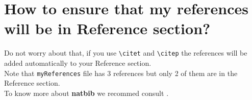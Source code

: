 \documentclass[10pt]{article}
\begin{document}
\section{How to ensure that my references will be in Reference section?}
Do not worry about that, if you use \verb|\citet| and \verb|\citep| the references will be added automatically to your Reference section.\\

Note that \verb|myReferences| file has 3 references but only 2 of them are in the Reference section.\\

To know more about \textbf{natbib} we recommed consult \citet{natbib}.


\end{document}
